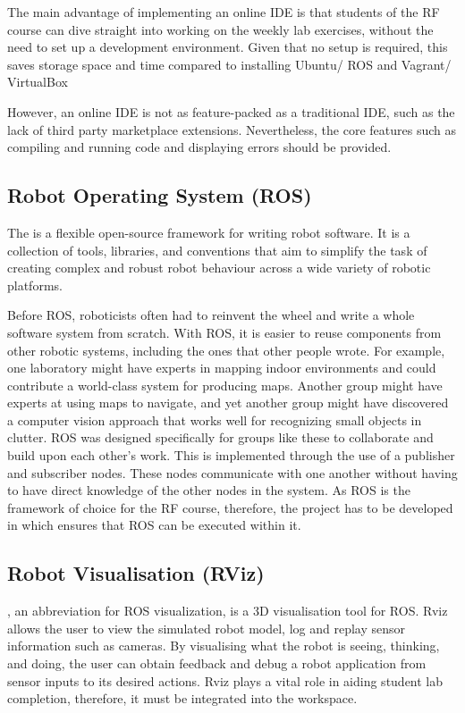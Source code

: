 \documentclass{l4proj}
\begin{document}
The main advantage of implementing an online IDE is that students of the RF course can dive straight into working on the weekly lab exercises, without the need to set up a development environment. Given that no setup is required, this saves storage space and time compared to installing Ubuntu/ ROS and Vagrant/ VirtualBox

However, an online IDE is not as feature-packed as a traditional IDE, such as the lack of third party marketplace extensions. Nevertheless, the core features such as compiling and running code and displaying errors should be provided.

\subsection{Robot Operating System (ROS)}

The \cite{ROS} is a flexible open-source framework for writing robot software. It is a collection of tools, libraries, and conventions that aim to simplify the task of creating complex and robust robot behaviour across a wide variety of robotic platforms. 

Before ROS, roboticists often had to reinvent the wheel and write a whole software system from scratch. With ROS, it is easier to reuse components from other robotic systems, including the ones that other people wrote. For example, one laboratory might have experts in mapping indoor environments and could contribute a world-class system for producing maps. Another group might have experts at using maps to navigate, and yet another group might have discovered a computer vision approach that works well for recognizing small objects in clutter. ROS was designed specifically for groups like these to collaborate and build upon each other's work. This is implemented through the use of a publisher and subscriber nodes. These nodes communicate with one another without having to have direct knowledge of the other nodes in the system. As ROS is the framework of choice for the RF course, therefore, the project has to be developed in which ensures that ROS can be executed within it.

\subsection{Robot Visualisation (RViz)}

\cite{Rviz}, an abbreviation for ROS visualization, is a 3D visualisation tool for ROS. Rviz allows the user to view the simulated robot model, log and replay sensor information such as cameras. By visualising what the robot is seeing, thinking, and doing, the user can obtain feedback and debug a robot application from sensor inputs to its desired actions. Rviz plays a vital role in aiding student lab completion, therefore, it must be integrated into the workspace.
\end{document}
